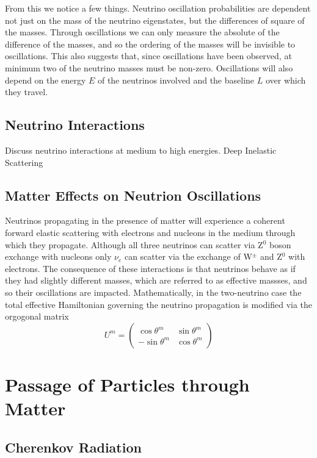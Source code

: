 \documentclass[main.tex]{subfiles}
\begin{document}
From this we notice a few things. 
Neutrino oscillation probabilities are dependent not just on the mass of the neutrino eigenstates, but the differences of square of the masses. 
Through oscillations we can only measure the absolute of the difference of the masses, and so the ordering of the masses will be invisible to oscillations. 
This also suggests that, since oscillations have been observed, at minimum two of the neutrino masses must be non-zero. 
Oscillations will also depend on the energy $E$ of the neutrinos involved and the baseline $L$ over which they travel. 


\subsection{Neutrino Interactions}
Discuss neutrino interactions at medium to high energies. Deep Inelastic Scattering

\subsection{Matter Effects on Neutrion Oscillations}
Neutrinos propagating in the presence of matter will experience a coherent forward elastic scattering with electrons and nucleons in the medium through which they propagate. Although all three neutrinos can scatter via Z$^{0}$ boson exchange with nucleons only $\nu_{e}$ can scatter via the exchange of W$^{\pm}$ and Z$^{0}$ with electrons. 
The consequence of these interactions is that neutrinos behave as if they had slightly different masses, which are referred to as effective massses, and so their oscillations are impacted.  
Mathematically, in the two-neutrino case the total effective Hamiltonian governing the neutrino propagation is modified via the orgogonal matrix 
\begin{equation}
    U^{m} = \left( \begin{array}{cc} \cos\theta^{m} & \sin\theta^{m} \\ -\sin\theta^{m} & \cos\theta^{m} \end{array}\right) 
\end{equation}


\section{Passage of Particles through Matter}

\subsection{Cherenkov Radiation}
\end{document}
